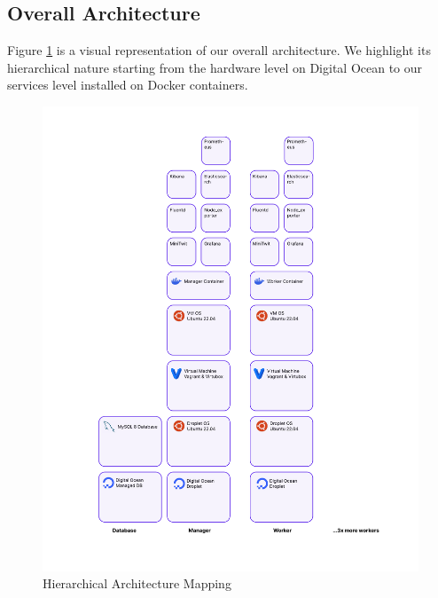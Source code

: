 \documentclass{article}
\begin{document}
\subsection{Overall Architecture}
Figure \ref{fig:high_arch} is a visual representation of our overall architecture. We highlight its hierarchical nature starting from the hardware level on Digital Ocean to our services level installed on Docker containers. 
\begin{figure}
    \centering
    \includegraphics[width=1\linewidth]{./pdfs/group_16.pdf}
    \caption{Hierarchical Architecture Mapping}
    \label{fig:high_arch}
\end{figure}
\end{document}

